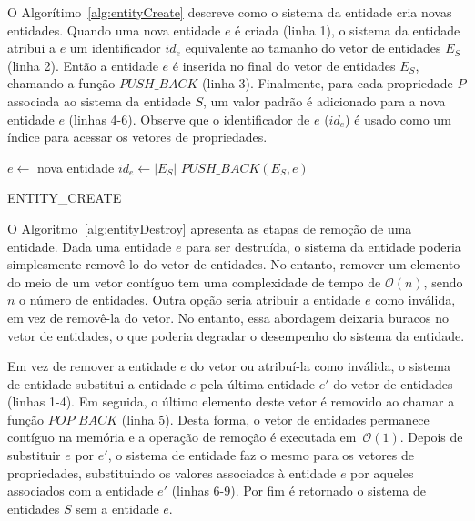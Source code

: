 

O Algorítimo~\ref{alg:entityCreate} descreve como o sistema da entidade cria novas entidades. Quando uma nova entidade $ e $ é criada (linha 1), o sistema da entidade atribui a $ e $ um identificador $ id_e $ equivalente ao tamanho do vetor de entidades $ E_S $ (linha 2). Então a entidade $ e $ é inserida no final do vetor de entidades $ E_S $, chamando a função $ PUSH\_BACK $ (linha 3). Finalmente, para cada propriedade $P$ associada ao sistema da entidade $S$, um valor padrão é adicionado para a nova entidade $ e $ (linhas 4-6). Observe que o identificador de $ e $ ($ id_e $) é usado como um índice para acessar os vetores de propriedades.

\begin{algorithm}[ht]
 \LinesNumbered
      $e \gets $ nova entidade\;
      $id_e \gets |E_S|$\;
      $PUSH\_BACK(E_S, e)$\;
      \;
   \caption{ENTITY\_CREATE}
   \label{alg:entityCreate}
 \end{algorithm}

 O Algoritmo~\ref{alg:entityDestroy} apresenta as etapas de remoção de uma entidade. Dada uma entidade $ e $ para ser destruída, o sistema da entidade poderia simplesmente removê-lo do vetor de entidades. No entanto, remover um elemento do meio de um vetor contíguo tem uma complexidade de tempo de $\mathcal{O}(n)$, sendo $ n $ o número de entidades. Outra opção seria atribuir a entidade $ e $ como inválida, em vez de removê-la do vetor. No entanto, essa abordagem deixaria buracos no vetor de entidades, o que poderia degradar o desempenho do sistema da entidade.

  Em vez de remover a entidade $ e $ do vetor ou atribuí-la como inválida, o sistema de entidade substitui a entidade $e$ pela última entidade $e'$ do vetor de entidades (linhas 1-4). Em seguida, o último elemento deste vetor é removido ao chamar a função $ POP\_BACK $ (linha 5). Desta forma, o vetor de entidades permanece contíguo na memória e a operação de remoção é executada em~$\mathcal{O}(1)$. Depois de substituir $ e $ por $ e' $, o sistema de entidade faz o mesmo para os vetores de propriedades, substituindo os valores associados à entidade $ e $ por aqueles associados com a entidade $ e' $ (linhas 6-9). Por fim é retornado o sistema de entidades $S$ sem a entidade $e$.

